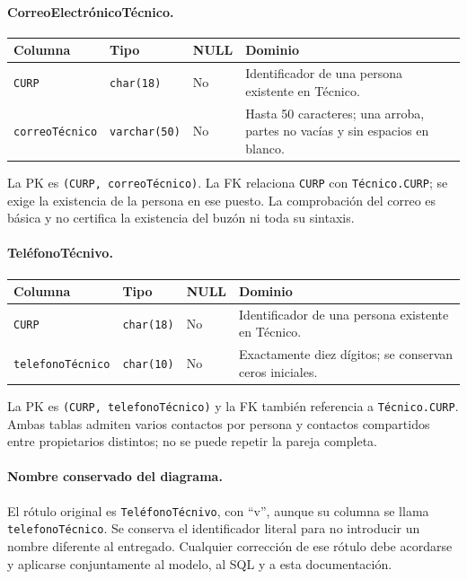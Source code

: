 \paragraph{CorreoElectrónicoTécnico.}
\noindent\begin{tabular}{@{}p{}p{}p{}p{}@{}}
\hline
\textbf{Columna} & \textbf{Tipo} & \textbf{NULL} & \textbf{Dominio} \\
\hline
\texttt{CURP} & \texttt{char(18)} & No & Identificador de una persona existente en Técnico. \\
\texttt{correoTécnico} & \texttt{varchar(50)} & No & Hasta 50 caracteres; una arroba, partes no vacías y sin espacios en blanco. \\
\hline
\end{tabular}

La PK es \texttt{(CURP, correoTécnico)}. La FK relaciona
\texttt{CURP} con \texttt{Técnico.CURP}; se exige la existencia de
la persona en ese puesto. La comprobación del correo es básica y no
certifica la existencia del buzón ni toda su sintaxis.

\paragraph{TeléfonoTécnivo.}
\noindent\begin{tabular}{@{}p{}p{}p{}p{}@{}}
\hline
\textbf{Columna} & \textbf{Tipo} & \textbf{NULL} & \textbf{Dominio} \\
\hline
\texttt{CURP} & \texttt{char(18)} & No & Identificador de una persona existente en Técnico. \\
\texttt{telefonoTécnico} & \texttt{char(10)} & No & Exactamente diez dígitos; se conservan ceros iniciales. \\
\hline
\end{tabular}

La PK es \texttt{(CURP, telefonoTécnico)} y la FK también referencia
a \texttt{Técnico.CURP}. Ambas tablas admiten varios contactos por
persona y contactos compartidos entre propietarios distintos; no se
puede repetir la pareja completa.

\paragraph{Nombre conservado del diagrama.}
El rótulo original es \texttt{TeléfonoTécnivo}, con ``v'', aunque su
columna se llama \texttt{telefonoTécnico}. Se conserva el identificador
literal para no introducir un nombre diferente al entregado. Cualquier
corrección de ese rótulo debe acordarse y aplicarse conjuntamente al
modelo, al SQL y a esta documentación.


